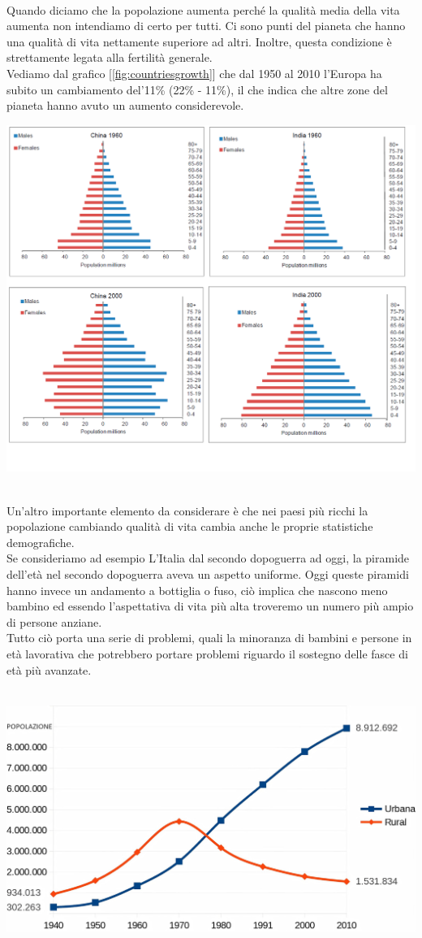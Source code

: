 \documentclass[a4paper,12pt, oneside]{book}
\begin{document}
\leavevmode\\
Quando diciamo che la popolazione aumenta perché la qualità media della vita aumenta non intendiamo di certo per tutti. Ci sono punti del pianeta che hanno una qualità di vita nettamente superiore ad altri. Inoltre, questa condizione è strettamente legata alla fertilità generale.\\
Vediamo dal grafico [\ref{fig:countriesgrowth}] che dal 1950 al 2010 l'Europa ha subito un cambiamento del'11\%   (22\% - 11\%), il che indica che altre zone del pianeta hanno avuto un aumento considerevole.
\leavevmode\\
 \begin{center}
   \includegraphics[width=0.7\linewidth]{"Immagini/pyramid-demographic"}
 \end{center}
\leavevmode\\
Un'altro importante elemento da considerare è che nei paesi più ricchi la popolazione cambiando qualità di vita cambia anche le proprie statistiche demografiche.\\
Se consideriamo ad esempio L'Italia dal secondo dopoguerra ad oggi, la piramide dell'età nel secondo dopoguerra aveva un aspetto uniforme. Oggi queste piramidi hanno invece un andamento a bottiglia o fuso, ciò implica che nascono meno bambino ed essendo l'aspettativa di vita più alta troveremo un numero più ampio di persone anziane.\\
Tutto ciò porta una serie di problemi, quali la minoranza di bambini e persone in età lavorativa che potrebbero portare problemi riguardo il sostegno delle fasce di età più avanzate.\\
\leavevmode\\
 \begin{center}
   \includegraphics[width=0.7\linewidth]{"Immagini/popolazione urbana-rurale"}
 \end{center}
\end{document}
